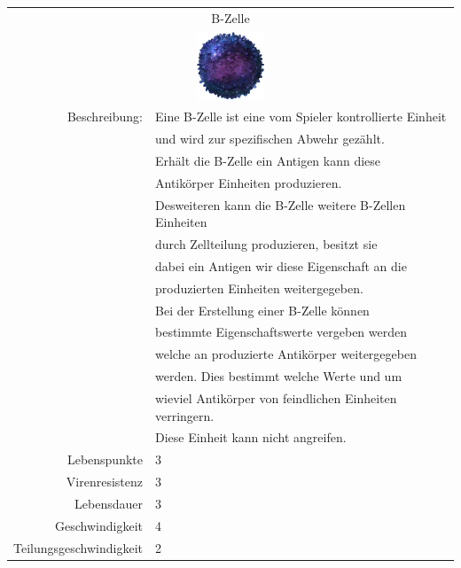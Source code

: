 \documentclass[11pt]{article}
\begin{document}
\begin{tabular}{|r|l|}
\hline
\multicolumn{2}{c}{B-Zelle}\\
\multicolumn{2}{c}{\includegraphics[width=2cm]{bcellorig.png}}\\\hline\hline
Beschreibung:	& Eine B-Zelle ist eine vom Spieler kontrollierte Einheit\\
			& und wird zur spezifischen Abwehr gez\"ahlt.\\
			& Erh\"alt die B-Zelle ein Antigen kann diese\\
			& Antik\"orper Einheiten produzieren.\\
			& Desweiteren kann die B-Zelle weitere B-Zellen Einheiten\\
			& durch Zellteilung produzieren, besitzt sie\\
			& dabei ein Antigen wir diese Eigenschaft an die\\
			& produzierten Einheiten weitergegeben.\\
			& Bei der Erstellung einer B-Zelle k\"onnen\\
			& bestimmte Eigenschaftswerte vergeben werden\\
			& welche an produzierte Antik\"orper weitergegeben\\
			& werden. Dies bestimmt welche Werte und um\\
			& wieviel Antik\"orper von feindlichen Einheiten verringern.\\
			& Diese Einheit kann nicht angreifen.\\\hline
Lebenspunkte	& 3\\\hline
Virenresistenz	& 3\\\hline
Lebensdauer		& 3\\\hline
Geschwindigkeit	& 4\\\hline
Teilungsgeschwindigkeit	& 2\\\hline
\end{tabular}
\end{document}
